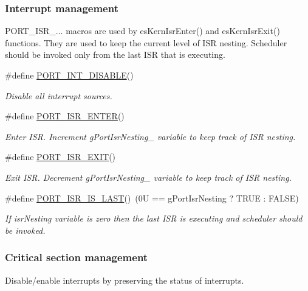 \subsubsection*{Interrupt management}
\label{_amgrp0762f598cbb5b37886374004ead985d4}%
P\-O\-R\-T\-\_\-\-I\-S\-R\-\_\-... macros are used by es\-Kern\-Isr\-Enter() and es\-Kern\-Isr\-Exit() functions. They are used to keep the current level of I\-S\-R nesting. Scheduler should be invoked only from the last I\-S\-R that is executing. \begin{DoxyCompactItemize}
\item 
\#define \hyperlink{group__template__cpu__intf_gac73a0b0b3d8a130a8d8283be5bba057d}{P\-O\-R\-T\-\_\-\-I\-N\-T\-\_\-\-D\-I\-S\-A\-B\-L\-E}()
\begin{DoxyCompactList}\small\item\em Disable all interrupt sources. \end{DoxyCompactList}\item 
\#define \hyperlink{group__template__cpu__intf_gaccad9298c874b29753b318d4f900cb75}{P\-O\-R\-T\-\_\-\-I\-S\-R\-\_\-\-E\-N\-T\-E\-R}()
\begin{DoxyCompactList}\small\item\em Enter I\-S\-R. Increment g\-Port\-Isr\-Nesting\-\_\- variable to keep track of I\-S\-R nesting. \end{DoxyCompactList}\item 
\#define \hyperlink{group__template__cpu__intf_ga267c312d7321e9361b454f4274bbc087}{P\-O\-R\-T\-\_\-\-I\-S\-R\-\_\-\-E\-X\-I\-T}()
\begin{DoxyCompactList}\small\item\em Exit I\-S\-R. Decrement g\-Port\-Isr\-Nesting\-\_\- variable to keep track of I\-S\-R nesting. \end{DoxyCompactList}\item 
\#define \hyperlink{group__template__cpu__intf_ga6c0ea20c8e1f6b9751f51916da8e2aee}{P\-O\-R\-T\-\_\-\-I\-S\-R\-\_\-\-I\-S\-\_\-\-L\-A\-S\-T}()~(0\-U == g\-Port\-Isr\-Nesting ? T\-R\-U\-E \-: F\-A\-L\-S\-E)
\begin{DoxyCompactList}\small\item\em If isr\-Nesting variable is zero then the last I\-S\-R is executing and scheduler should be invoked. \end{DoxyCompactList}\end{DoxyCompactItemize}
\subsubsection*{Critical section management}
\label{_amgrp43784aebc31664bf2b83e85766997ec9}%
Disable/enable interrupts by preserving the status of interrupts.

